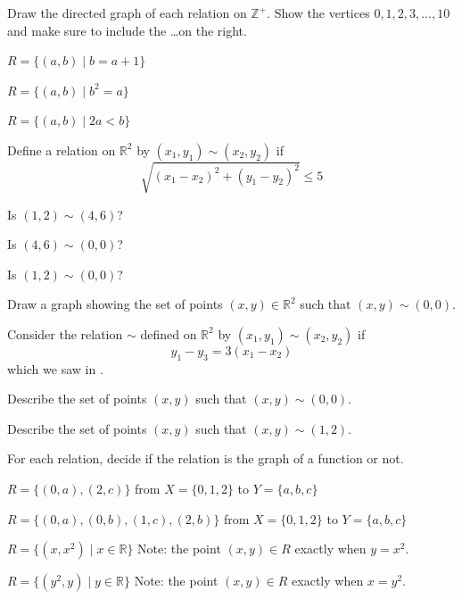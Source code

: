 \begin{exer}[\exerU] %
\label{exer_directed_graph_rel_infinite}
    Draw the directed graph of each relation on $\mathbb{Z}^+$.  Show the vertices $0,1,2,3,\ldots, 10$ and make sure to include the \ldots on the right.
        \begin{exerpart}
            \item $R = \{ (a,b) \mid b = a+1\}$
            \item $R = \{ (a,b) \mid b^2=a\}$
            \item $R = \{(a,b) \mid 2a< b\}$
        \end{exerpart}
\end{exer}

\begin{exer} [\exerU] %
\label{exer_distance_relation} 
    Define a relation on $\mathbb{R}^2$ by $(x_1,y_1) \sim (x_2,y_2)$ if $$\sqrt{(x_1-x_2)^2 + (y_1-y_2)^2} \le 5$$
        \begin{exerpart}
            \item Is $(1,2) \sim (4,6)$? 
            \item Is $(4,6) \sim (0,0)$?
            \item Is $(1,2) \sim (0,0)$?    
            \item Draw a graph showing the set of points $(x,y) \in \mathbb{R}^2$ such that $(x,y) \sim (0,0)$.
        \end{exerpart}
\end{exer}

\begin{exer} [\exerU] %
\label{exer_slope_relation} 
    Consider the relation $\sim$ defined on $\mathbb{R}^2$ by $(x_1,y_1) \sim (x_2,y_2)$ if $$y_1-y_3=3(x_1-x_2)$$
    which we saw in .
        \begin{exerpart}
            \item Describe the set of points $(x,y)$ such that $(x,y) \sim (0,0)$.
            \item Describe the set of points $(x,y)$ such that $ (x,y)\sim (1,2)$.
        \end{exerpart}
\end{exer}

\begin{exer}[\exerU] %
\label{exer_is_graph_function} 
   For each relation, decide if the relation is the graph of a function or not.
       \begin{exerpart}
           \item $R = \{(0,a), (2,c)\}$ from $X = \{0,1,2\}$ to $Y= \{a,b,c\}$
           \item $R = \{(0,a), (0,b), (1,c), (2,b)\}$ from $X = \{0,1,2\}$ to $Y= \{a,b,c\}$
           \item $R = \{ (x,x^2) \mid x \in \mathbb{R}\}$  Note: the point $(x,y) \in R$ exactly when $y = x^2$.
           \item $R = \{ (y^2,y) \mid y \in \mathbb{R}\}$  Note: the point $(x,y) \in R$ exactly when $x = y^2$.
       \end{exerpart}
\end{exer}

